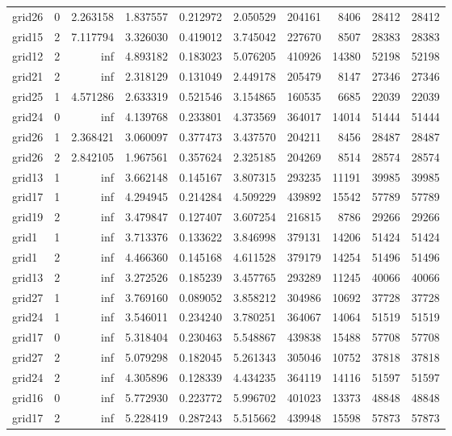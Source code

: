 \begin{longtable}{|l|r|r|r|r|r|r|r|r|r|}
grid26 & 0 & 2.263158 & 1.837557 & 0.212972 & 2.050529 & 204161 & 8406 & 28412 & 28412 \\
grid15 & 2 & 7.117794 & 3.326030 & 0.419012 & 3.745042 & 227670 & 8507 & 28383 & 28383 \\
grid12 & 2 & inf & 4.893182 & 0.183023 & 5.076205 & 410926 & 14380 & 52198 & 52198 \\
grid21 & 2 & inf & 2.318129 & 0.131049 & 2.449178 & 205479 & 8147 & 27346 & 27346 \\
grid25 & 1 & 4.571286 & 2.633319 & 0.521546 & 3.154865 & 160535 & 6685 & 22039 & 22039 \\
grid24 & 0 & inf & 4.139768 & 0.233801 & 4.373569 & 364017 & 14014 & 51444 & 51444 \\
grid26 & 1 & 2.368421 & 3.060097 & 0.377473 & 3.437570 & 204211 & 8456 & 28487 & 28487 \\
grid26 & 2 & 2.842105 & 1.967561 & 0.357624 & 2.325185 & 204269 & 8514 & 28574 & 28574 \\
grid13 & 1 & inf & 3.662148 & 0.145167 & 3.807315 & 293235 & 11191 & 39985 & 39985 \\
grid17 & 1 & inf & 4.294945 & 0.214284 & 4.509229 & 439892 & 15542 & 57789 & 57789 \\
grid19 & 2 & inf & 3.479847 & 0.127407 & 3.607254 & 216815 & 8786 & 29266 & 29266 \\
grid1 & 1 & inf & 3.713376 & 0.133622 & 3.846998 & 379131 & 14206 & 51424 & 51424 \\
grid1 & 2 & inf & 4.466360 & 0.145168 & 4.611528 & 379179 & 14254 & 51496 & 51496 \\
grid13 & 2 & inf & 3.272526 & 0.185239 & 3.457765 & 293289 & 11245 & 40066 & 40066 \\
grid27 & 1 & inf & 3.769160 & 0.089052 & 3.858212 & 304986 & 10692 & 37728 & 37728 \\
grid24 & 1 & inf & 3.546011 & 0.234240 & 3.780251 & 364067 & 14064 & 51519 & 51519 \\
grid17 & 0 & inf & 5.318404 & 0.230463 & 5.548867 & 439838 & 15488 & 57708 & 57708 \\
grid27 & 2 & inf & 5.079298 & 0.182045 & 5.261343 & 305046 & 10752 & 37818 & 37818 \\
grid24 & 2 & inf & 4.305896 & 0.128339 & 4.434235 & 364119 & 14116 & 51597 & 51597 \\
grid16 & 0 & inf & 5.772930 & 0.223772 & 5.996702 & 401023 & 13373 & 48848 & 48848 \\
grid17 & 2 & inf & 5.228419 & 0.287243 & 5.515662 & 439948 & 15598 & 57873 & 57873 \\

\end{longtable}
